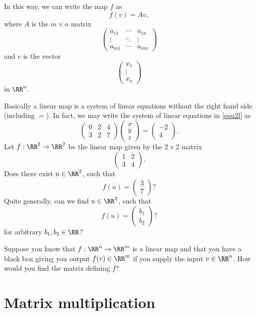 \documentclass{article}
\begin{document}
In this way, we can write the map $f$ as
$$
f(v) = A v,
$$
where $A$ is the $m\times n$ matrix
$$
\begin{pmatrix}
a_{11} & \cdots & a_{1n}\\
\vdots & \ddots & \vdots\\
a_{m1} & \cdots & a_{mn}
\end{pmatrix}
$$
and $v$ is the vector
$$
\begin{pmatrix} x_1 \\ \vdots \\ x_n\end{pmatrix}
$$
in $\RR^n$.

Basically a linear map is a system of linear equations without the right hand side (including $=$).
In fact, we may write the system of linear equations in \eqref{equ2l} as
$$
\begin{pmatrix}
0 & 2 & 4\\
3 & 2 & 7
\end{pmatrix}
\begin{pmatrix}
  x \\ y \\ z
\end{pmatrix}
=
\begin{pmatrix}
  -2 \\ 4
\end{pmatrix}.
$$
\beginshex
Let $f: \RR^2\rightarrow \RR^2$ be the linear map given by the $2\times 2$ matrix
$$
\begin{pmatrix}
  1 & 2\\
  3 & 4
\end{pmatrix}.
$$
Does there exist $u\in \RR^2$, such that
$$
f(u) = \begin{pmatrix} 3 \\ 7 \end{pmatrix}?
$$
Quite generally, can we find $u\in \RR^2$, such that
$$
f(u) = \begin{pmatrix} b_1 \\ b_2 \end{pmatrix}?
$$
for arbitrary $b_1, b_2\in \RR$?
\endshex

\beginshex
Suppose you know that $f: \RR^n\rightarrow \RR^m$ is a linear map and
that you have a black box giving you output $f(v)\in \RR^m$ if you
supply the input $v\in \RR^n$. How would you find
the matrix defining $f$?
\endshex


\section{Matrix multiplication}
\end{document}
